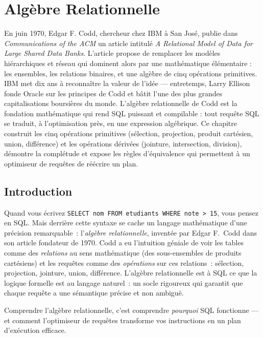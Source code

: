 \chapter{Alg\`ebre Relationnelle}
\label{ch:algebre}

En juin 1970, Edgar F. Codd, chercheur chez IBM à San José, publie dans \emph{Communications of the ACM} un article intitulé \emph{A Relational Model of Data for Large Shared Data Banks}. L'article propose de remplacer les modèles hiérarchiques et réseau qui dominent alors par une mathématique élémentaire : les ensembles, les relations binaires, et une algèbre de cinq opérations primitives. IBM met dix ans à reconnaître la valeur de l'idée --- entretemps, Larry Ellison fonde Oracle sur les principes de Codd et bâtit l'une des plus grandes capitalisations boursières du monde. L'algèbre relationnelle de Codd est la fondation mathématique qui rend SQL puissant et compilable : tout requête SQL se traduit, à l'optimisation près, en une expression algébrique. Ce chapitre construit les cinq opérations primitives (sélection, projection, produit cartésien, union, différence) et les opérations dérivées (jointure, intersection, division), démontre la complétude et expose les règles d'équivalence qui permettent à un optimiseur de requêtes de réécrire un plan.

\section{Introduction}

Quand vous \'ecrivez \texttt{SELECT nom FROM etudiants WHERE note > 15}, vous pensez en SQL. Mais derri\`ere cette syntaxe se cache un langage math\'ematique d'une pr\'ecision remarquable~: l'\emph{alg\`ebre relationnelle}, invent\'ee par Edgar F.\ Codd dans son article fondateur de 1970. Codd a eu l'intuition g\'eniale de voir les tables comme des \emph{relations} au sens math\'ematique (des sous-ensembles de produits cart\'esiens) et les requ\^etes comme des \emph{op\'erations} sur ces relations~: s\'election, projection, jointure, union, diff\'erence. L'alg\`ebre relationnelle est \`a SQL ce que la logique formelle est au langage naturel~: un socle rigoureux qui garantit que chaque requ\^ete a une s\'emantique pr\'ecise et non ambigu\"e.

Comprendre l'alg\`ebre relationnelle, c'est comprendre \emph{pourquoi} SQL fonctionne --- et comment l'optimiseur de requ\^etes transforme vos instructions en un plan d'ex\'ecution efficace.

